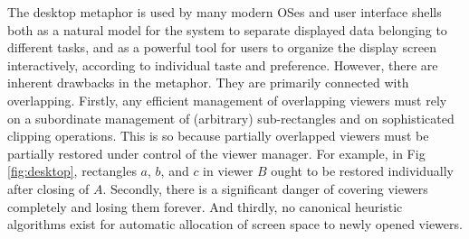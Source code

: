 The desktop metaphor is used by many modern OSes and user interface shells both
as a natural model for the system to separate displayed data belonging to different tasks, and as a
powerful tool for users to organize the display screen interactively, according to individual taste
and preference. However, there are inherent drawbacks in the metaphor. They are primarily
connected with overlapping. Firstly, any efficient management of overlapping viewers must rely on
a subordinate management of (arbitrary) sub-rectangles and on sophisticated clipping operations.
This is so because partially overlapped viewers must be partially restored under control of the
viewer manager. For example, in Fig \ref{fig:desktop}, rectangles $a$, $b$, and $c$ in viewer $B$ ought 
to be restored individually after closing of $A$. Secondly, there is a significant danger of covering
viewers completely and losing them forever. And thirdly, no canonical heuristic algorithms exist for
automatic allocation of screen space to newly opened viewers.

